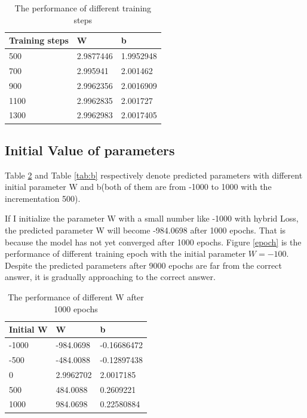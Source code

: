 \documentclass{article}
\begin{document}
\begin{table}[!h]
  \caption{The performance of different training steps}
  \label{tab:ts}
  \centering
  \begin{tabular}{lll}
    \toprule
    Training steps     & W     & b \\
    \midrule
    500 & 2.9877446  & 1.9952948     \\
    700     & 2.995941 & 2.001462     \\
    900     & 2.9962356       & 2.0016909  \\
    1100     & 2.9962835 & 2.001727      \\
    1300    & 2.9962983      & 2.0017405  \\
    \bottomrule
  \end{tabular}
\end{table}

\subsection{Initial Value of parameters}
Table \ref{tab:w} and Table \ref{tab:b} respectively denote predicted parameters with different initial parameter W and b(both of them are from -1000 to 1000 with the incrementation 500).

If I initialize the parameter W with a small number like -1000 with hybrid Loss, the predicted parameter W will become -984.0698 after 1000 epochs. That is because the model has not yet converged after 1000 epochs. Figure \ref{epoch} is the performance of different training epoch with the initial parameter $W=-100$. Despite the predicted parameters after 9000 epochs are far from the correct answer, it is gradually approaching to the correct answer.

\begin{table}[!h]
  \caption{The performance of different W after 1000 epochs}
  \label{tab:w}
  \centering
  \begin{tabular}{lll}
    \toprule
    Initial W     & W     & b  \\
    \midrule
    -1000 & -984.0698 & -0.16686472    \\
    -500     & -484.0088 & -0.12897438     \\
    0     & 2.9962702      & 2.0017185  \\
    500     & 484.0088 & 0.2609221     \\
    1000    & 984.0698     & 0.22580884  \\
    \bottomrule
  \end{tabular}
\end{table}
\end{document}
